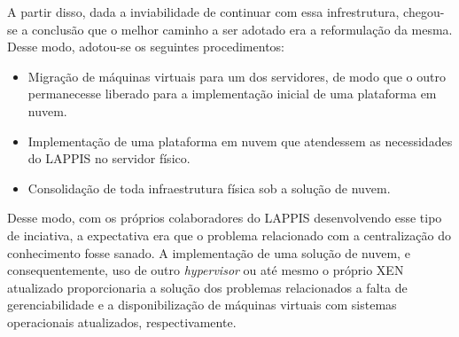 \begin{apendicesenv}
      A partir disso, dada a inviabilidade de continuar com essa infrestrutura, chegou-se a conclusão que o melhor caminho a ser adotado era a reformulação da mesma. Desse modo, adotou-se os seguintes procedimentos:
\begin{itemize}
      \item Migração de máquinas virtuais para um dos servidores, de modo que o outro permanecesse liberado para a implementação inicial de uma plataforma em nuvem.
      \item	Implementação de uma plataforma em nuvem que atendessem as necessidades do LAPPIS no servidor físico.
      \item Consolidação de toda infraestrutura física sob a solução de nuvem.
\end{itemize}      
      
      
Desse modo, com os próprios colaboradores do LAPPIS desenvolvendo esse tipo de inciativa, a expectativa era que o problema relacionado com a centralização do conhecimento fosse sanado. A implementação de uma solução de nuvem, e consequentemente, uso de outro \textit{hypervisor} ou até mesmo o próprio XEN atualizado proporcionaria a solução dos problemas relacionados a falta de gerenciabilidade e a disponibilização de máquinas virtuais com sistemas operacionais atualizados, respectivamente.        
                

\end{apendicesenv}
